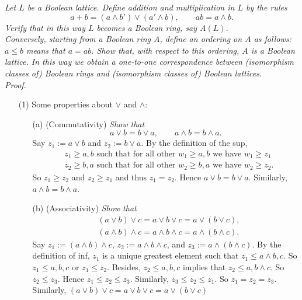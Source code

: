 \documentclass{article}
\begin{document}
\emph{Let $L$ be a Boolean lattice.
Define addition and multiplication in $L$ by the rules
\[
  a + b = (a \wedge b') \vee (a' \wedge b),
  \qquad
  ab = a \wedge b.
\]
Verify that in this way $L$ becomes a Boolean ring, say $A(L)$.} \\

\emph{Conversely, starting from a Boolean ring $A$, define an ordering on $A$ as follows:
$a \leq b$ means that $a = ab$.
Show that, with respect to this ordering, $A$ is a Boolean lattice.
In this way we obtain a one-to-one correspondence between (isomorphism classes of) Boolean rings and
(isomorphism classes of) Boolean lattices.} \\



\emph{Proof.}
\begin{enumerate}
\item[(1)]
  Some properties about $\vee$ and $\wedge$:
  \begin{enumerate}
  \item[(a)]
    (Commutativity)
    \emph{Show that}
    \[
      a \vee b = b \vee a,
      \qquad
      a \wedge b = b \wedge a.
    \]
    Say $z_1 := a \vee b$ and $z_2 := b \vee a$.
    By the definition of the sup,
    \begin{align*}
      &\text{$z_1 \geq a, b$ such that for all other $w_1 \geq a, b$ we have $w_1 \geq z_1$} \\
      &\text{$z_2 \geq b, a$ such that for all other $w_2 \geq b, a$ we have $w_2 \geq z_2$}.
    \end{align*}
    So $z_1 \geq z_2$ and $z_2 \geq z_1$ and thus $z_1 = z_2$.
    Hence $a \vee b = b \vee a$.
    Similarly, $a \wedge b = b \wedge a$.

  \item[(b)]
    (Associativity)
    \emph{Show that}
    \begin{align*}
      & (a \vee b) \vee c = a \vee b \vee c = a \vee (b \vee c), \\
      & (a \wedge b) \wedge c = a \wedge b \wedge c = a \wedge (b \wedge c).
    \end{align*}
    Say $z_1 := (a \wedge b) \wedge c$, $z_2 := a \wedge b \wedge c$, and $z_3 := a \wedge (b \wedge c)$.
    By the definition of inf,
    $z_1$ is a unique greatest element such that $z_1 \leq a \wedge b, c$.
    So $z_1 \leq a, b, c$ or $z_1 \leq z_2$.
    Besides, $z_2 \leq a, b, c$ implies that $z_2 \leq a, b \wedge c$.
    So $z_2 \leq z_3$.
    Hence $z_1 \leq z_2 \leq z_3$.
    Similarly, $z_3 \leq z_2 \leq z_1$.
    So $z_1 = z_2 = z_3$.
    Similarly, $(a \vee b) \vee c = a \vee b \vee c = a \vee (b \vee c)$


\end{enumerate}
\end{enumerate}
\end{document}
